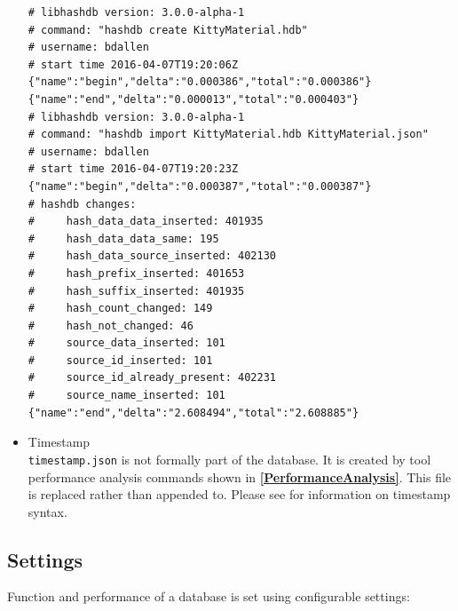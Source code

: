 \documentclass[11pt,fleqn]{article} %
\begin{document}
\begin{itemize}
\lstset{style=customfile}
\begin{lstlisting}[float, caption=An example \texttt{log.xml} log file showing two database activities, label=logfile]
# libhashdb version: 3.0.0-alpha-1
# command: "hashdb create KittyMaterial.hdb"
# username: bdallen
# start time 2016-04-07T19:20:06Z
{"name":"begin","delta":"0.000386","total":"0.000386"}
{"name":"end","delta":"0.000013","total":"0.000403"}
# libhashdb version: 3.0.0-alpha-1
# command: "hashdb import KittyMaterial.hdb KittyMaterial.json"
# username: bdallen
# start time 2016-04-07T19:20:23Z
{"name":"begin","delta":"0.000387","total":"0.000387"}
# hashdb changes:
#     hash_data_data_inserted: 401935
#     hash_data_data_same: 195
#     hash_data_source_inserted: 402130
#     hash_prefix_inserted: 401653
#     hash_suffix_inserted: 401935
#     hash_count_changed: 149
#     hash_not_changed: 46
#     source_data_inserted: 101
#     source_id_inserted: 101
#     source_id_already_present: 402231
#     source_name_inserted: 101
{"name":"end","delta":"2.608494","total":"2.608885"}
\end{lstlisting}


\item Timestamp\\
\verb+timestamp.json+ is not formally part of the \hdb database.  It is created by \hdb tool performance analysis commands shown in \textbf{\autoref{PerformanceAnalysis}}. This file is replaced rather than appended to. Please see \textbf{} for information on timestamp syntax.

\end{itemize}



\subsection{Settings}
\label{Settings}
Function and performance of a \hdb database is set using configurable settings:\\
\end{document}
